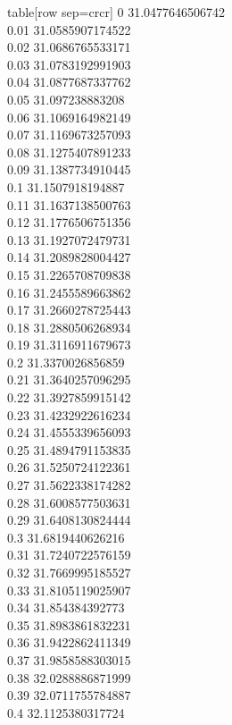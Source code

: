   table[row sep=crcr]{%
0	31.0477646506742\\
0.01	31.0585907174522\\
0.02	31.0686765533171\\
0.03	31.0783192991903\\
0.04	31.0877687337762\\
0.05	31.097238883208\\
0.06	31.1069164982149\\
0.07	31.1169673257093\\
0.08	31.1275407891233\\
0.09	31.1387734910445\\
0.1	31.1507918194887\\
0.11	31.1637138500763\\
0.12	31.1776506751356\\
0.13	31.1927072479731\\
0.14	31.2089828004427\\
0.15	31.2265708709838\\
0.16	31.2455589663862\\
0.17	31.2660278725443\\
0.18	31.2880506268934\\
0.19	31.3116911679673\\
0.2	31.3370026856859\\
0.21	31.3640257096295\\
0.22	31.3927859915142\\
0.23	31.4232922616234\\
0.24	31.4555339656093\\
0.25	31.4894791153835\\
0.26	31.5250724122361\\
0.27	31.5622338174282\\
0.28	31.6008577503631\\
0.29	31.6408130824444\\
0.3	31.6819440626216\\
0.31	31.7240722576159\\
0.32	31.7669995185527\\
0.33	31.8105119025907\\
0.34	31.854384392773\\
0.35	31.8983861832231\\
0.36	31.9422862411349\\
0.37	31.9858588303015\\
0.38	32.0288886871999\\
0.39	32.0711755784887\\
0.4	32.1125380317724\\
}
